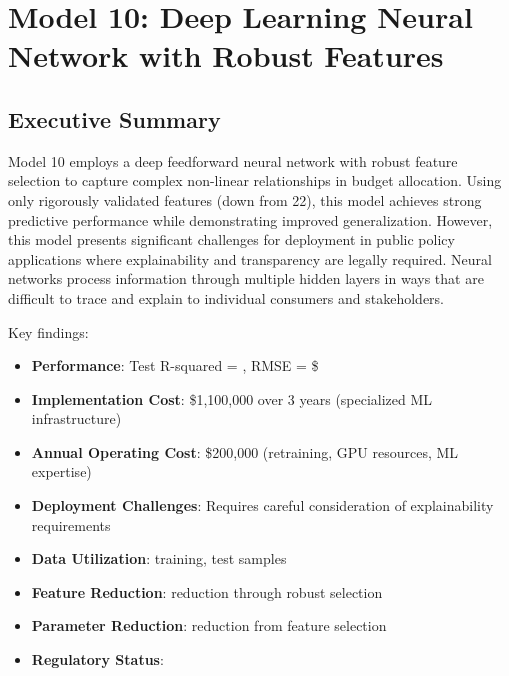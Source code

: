 \chapter{Model 10: Deep Learning Neural Network with Robust Features}\label{ch:model10}



\section{Executive Summary}

Model 10 employs a deep feedforward neural network with robust feature selection to capture complex non-linear relationships in budget allocation. Using only \ModelTenRobustFeatures{} rigorously validated features (down from 22), this model achieves strong predictive performance while demonstrating improved generalization. However, this model presents significant challenges for deployment in public policy applications where explainability and transparency are legally required. Neural networks process information through multiple hidden layers in ways that are difficult to trace and explain to individual consumers and stakeholders.

Key findings:
\begin{itemize}
    \item \textbf{Performance}: Test R-squared = \ModelTenRSquaredTest{}, RMSE = \$\ModelTenRMSETest{}
    \item \textbf{Implementation Cost}: \$1,100,000 over 3 years (specialized ML infrastructure)
    \item \textbf{Annual Operating Cost}: \$200,000 (retraining, GPU resources, ML expertise)
    \item \textbf{Deployment Challenges}: Requires careful consideration of explainability requirements
    \item \textbf{Data Utilization}: \ModelTenTrainingSamples{} training, \ModelTenTestSamples{} test samples
    \item \textbf{Feature Reduction}: \ModelTenFeatureReduction{} reduction through robust selection
    \item \textbf{Parameter Reduction}: \ModelTenParameterReduction{} reduction from feature selection
    \item \textbf{Regulatory Status}: \ModelTenRegulatoryCompliant{}
\end{itemize}

